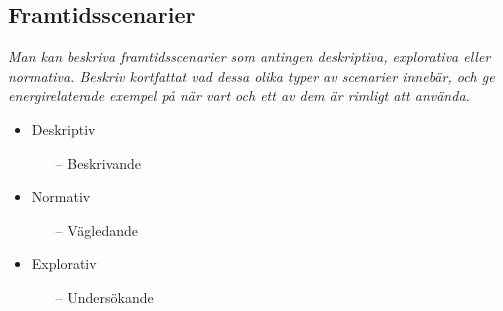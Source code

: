 \documentclass{article}
\begin{document}
\subsection{Framtidsscenarier}

\textit{Man kan beskriva framtidsscenarier som antingen deskriptiva, explorativa eller normativa. Beskriv kortfattat vad dessa olika typer av scenarier innebär, och ge energirelaterade exempel på när vart och ett av dem är rimligt att använda.}
\begin{itemize}
    \item Deskriptiv
    \begin{itemize}
        \item[--] Beskrivande
    \end{itemize}
    \item Normativ
    \begin{itemize}
        \item[--] Vägledande
    \end{itemize}
    \item Explorativ
    \begin{itemize}
        \item[--] Undersökande
    \end{itemize}
\end{itemize}
\end{document}
